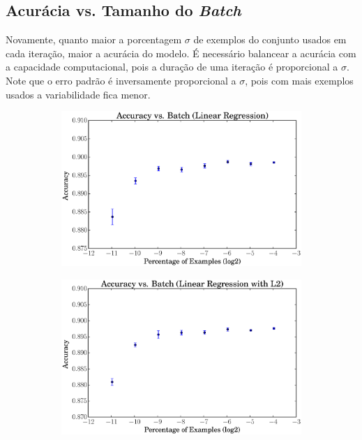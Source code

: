 \documentclass[a4paper, 12pt]{article}
\begin{document}
\newpage
\subsection{Acurácia vs. Tamanho do \textit{Batch}}

Novamente, quanto maior a porcentagem $\sigma$ de exemplos do conjunto usados
em cada iteração, maior a acurácia do modelo. É necessário balancear a acurácia
com a capacidade computacional, pois a duração de uma iteração é proporcional a
$\sigma$. Note que o erro padrão é inversamente proporcional a $\sigma$, pois
com mais exemplos usados a variabilidade fica menor.

\begin{figure}[htpb]
    \centering
    \begin{subfigure}[htpb]{0.45\textwidth}
        \includegraphics[width=\textwidth]{acc_vs_batchp_linreg}
        \caption{}
        \label{fig:batch_linreg}
    \end{subfigure}
    \begin{subfigure}[htpb]{0.45\textwidth}
        \includegraphics[width=\textwidth]{acc_vs_batchp_linregL2}

\end{subfigure}
\end{figure}
\end{document}
